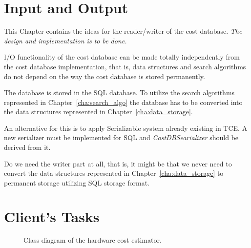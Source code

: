 \documentclass[a4paper,twoside]{tce}
\begin{document}
\chapter{Input and Output}
\label{cha:input_and_output}

This Chapter contains the ideas for the reader/writer of the cost
database. \emph{The design and implementation is to be done.}

I/O functionality of the cost database can be made totally independently
from the cost database implementation, that is, data structures and
search algorithms do not depend on the way the cost database is stored
permanently.

The database is stored in the SQL database. To utilize the search
algorithms represented in Chapter~\ref{cha:search_algo} the database
has to be converted into the data structures represented in
Chapter~\ref{cha:data_storage}.

An alternative for this is to apply Serializable system already
existing in TCE. A new serializer must be implemented for SQL and
\emph{CostDBSearializer} should be derived from it.

Do we need the writer part at all, that is, it might be that we never
need to convert the data structures represented in
Chapter~\ref{cha:data_storage} to permanent storage utilizing SQL
storage format.



\chapter{Client's Tasks}
\label{cha:client_tasks}

\begin{figure}[tb]
\centerline{}
\caption{Class diagram of the hardware cost estimator.}
\label{fig:class_client}
\end{figure}
\end{document}
